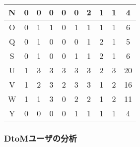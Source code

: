 \documentclass[11pt,dvipdfmx]{jreport}
\begin{document}
\begin{table}[h]
\begin{minipage}[t]{0.55\linewidth}
\begin{tabular}{c|c|cccccccc}
N                   & 0                                           & \multicolumn{1}{c|}{0} & \multicolumn{1}{c|}{0} & \multicolumn{1}{c|}{0} & \multicolumn{1}{c|}{0} & \multicolumn{1}{c|}{2} & \multicolumn{1}{c|}{1} & \multicolumn{1}{c|}{1} & 4  \\ \hline
O                   & 0                                           & \multicolumn{1}{c|}{1} & \multicolumn{1}{c|}{1} & \multicolumn{1}{c|}{0} & \multicolumn{1}{c|}{1} & \multicolumn{1}{c|}{1} & \multicolumn{1}{c|}{1} & \multicolumn{1}{c|}{1} & 6  \\ \hline
Q                   & 0                                           & \multicolumn{1}{c|}{1} & \multicolumn{1}{c|}{0} & \multicolumn{1}{c|}{0} & \multicolumn{1}{c|}{0} & \multicolumn{1}{c|}{1} & \multicolumn{1}{c|}{2} & \multicolumn{1}{c|}{1} & 5  \\ \hline
S                   & 0                                           & \multicolumn{1}{c|}{1} & \multicolumn{1}{c|}{0} & \multicolumn{1}{c|}{0} & \multicolumn{1}{c|}{1} & \multicolumn{1}{c|}{1} & \multicolumn{1}{c|}{2} & \multicolumn{1}{c|}{1} & 6  \\ \hline
U                   & 1                                           & \multicolumn{1}{c|}{3} & \multicolumn{1}{c|}{3} & \multicolumn{1}{c|}{3} & \multicolumn{1}{c|}{3} & \multicolumn{1}{c|}{3} & \multicolumn{1}{c|}{2} & \multicolumn{1}{c|}{3} & 20 \\ \hline
V                   & 1                                           & \multicolumn{1}{c|}{2} & \multicolumn{1}{c|}{3} & \multicolumn{1}{c|}{2} & \multicolumn{1}{c|}{3} & \multicolumn{1}{c|}{3} & \multicolumn{1}{c|}{1} & \multicolumn{1}{c|}{2} & 16 \\ \hline
W                   & 1                                           & \multicolumn{1}{c|}{1} & \multicolumn{1}{c|}{3} & \multicolumn{1}{c|}{0} & \multicolumn{1}{c|}{2} & \multicolumn{1}{c|}{2} & \multicolumn{1}{c|}{1} & \multicolumn{1}{c|}{2} & 11 \\ \hline
Y                   & 0                                           & \multicolumn{1}{c|}{0} & \multicolumn{1}{c|}{0} & \multicolumn{1}{c|}{0} & \multicolumn{1}{c|}{1} & \multicolumn{1}{c|}{1} & \multicolumn{1}{c|}{1} & \multicolumn{1}{c|}{1} & 4  \\ \hline
\end{tabular}
  \end{minipage}
\end{table}

\subsubsection*{DtoMユーザの分析}
\end{document}
